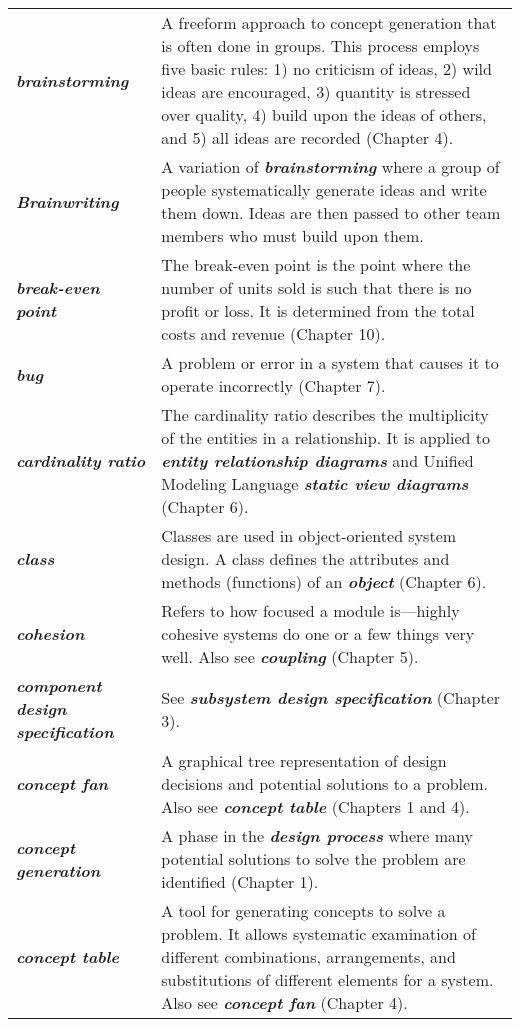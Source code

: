 \begin{longtable} { p{4cm} p{11cm}}
\emph{\textbf{brainstorming}} & A freeform approach to concept
generation that is often done in groups. This process employs five basic
rules: 1) no criticism of ideas, 2) wild ideas are encouraged, 3)
quantity is stressed over quality, 4) build upon the ideas of others,
and 5) all ideas are recorded (Chapter 4). \\
\emph{\textbf{Brainwriting}} & A variation of
\emph{\textbf{brainstorming}} where a group of people systematically
generate ideas and write them down. Ideas are then passed to other team
members who must build upon them. \\
\emph{\textbf{break-even point}} & The break-even point is the point
where the number of units sold is such that there is no profit or loss.
It is determined from the total costs and revenue (Chapter 10). \\
\emph{\textbf{bug}} & A problem or error in a system that causes it to
operate incorrectly (Chapter 7). \\
\emph{\textbf{cardinality ratio}} & The cardinality ratio describes the
multiplicity of the entities in a relationship. It is applied to
\emph{\textbf{entity relationship diagrams}} and Unified Modeling
Language \emph{\textbf{static view diagrams}} (Chapter 6). \\
\emph{\textbf{class}} & Classes are used in object-oriented system
design. A class defines the attributes and methods (functions) of an
\emph{\textbf{object}} (Chapter 6). \\
\emph{\textbf{cohesion}} & Refers to how focused a module is---highly
cohesive systems do one or a few things very well. Also see
\emph{\textbf{coupling}} (Chapter 5). \\
\emph{\textbf{component design specification}} & See
\emph{\textbf{subsystem design specification}} (Chapter 3). \\
\emph{\textbf{concept fan}} & A graphical tree representation of design
decisions and potential solutions to a problem. Also see
\emph{\textbf{concept table}} (Chapters 1 and 4). \\
\emph{\textbf{concept generation}} & A phase in the \emph{\textbf{design
process}} where many potential solutions to solve the problem are
identified (Chapter 1). \\
\emph{\textbf{concept table}} & A tool for generating concepts to solve
a problem. It allows systematic examination of different combinations,
arrangements, and substitutions of different elements for a system. Also
see \emph{\textbf{concept fan}} (Chapter 4). \\

\end{longtable}
